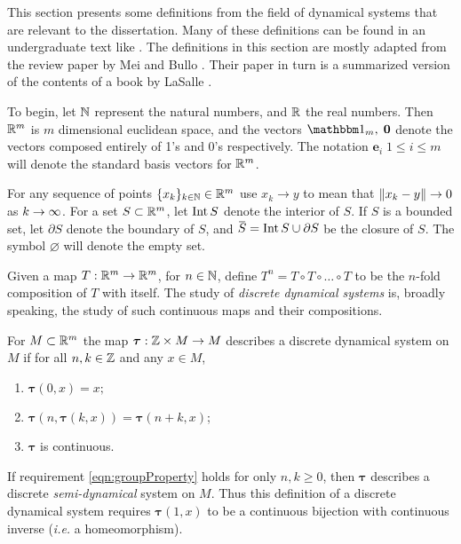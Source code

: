 
This section presents some definitions from the field of dynamical systems that are relevant to the dissertation.  Many of these definitions can be found in an undergraduate text like \cite{devaney1989introduction}. The definitions in this section are mostly adapted from the review paper by Mei and Bullo \cite{mei2017lasalle}. Their paper in turn is a summarized version of the contents of a book by LaSalle \cite{lasalle1976dynsys}.

To begin, let \( \mathbb N \) represent the natural numbers, and \( \mathbb R \) the real numbers. Then \( \mathbb R^m \) is \( m \) dimensional euclidean space, and the vectors \( \mathbbm 1_m,\;\bm 0 \) denote the vectors composed entirely of 1's and 0's respectively. The notation \( \bm e_i\;1\leq i\leq m \) will denote the standard basis vectors for \( \mathbb R^m \).

For any sequence of points \( \{x_k\}_{k\in\mathbb N} \in\mathbb R^m\) use \( {x_k}\rightarrow y \) to mean that \( \norm{x_k-y}\rightarrow 0 \) as \( k\rightarrow\infty\). For a set \( S\subset\mathbb R^m \), let \( \operatorname{Int}S \) denote the interior of \( S \). If \( S \) is a bounded set, let \( \partial S \) denote the boundary of \( S\), and \( \overbar S = \op{Int}S\cup \partial S\) be the closure of \( S \). The symbol \( \varnothing \) will denote the empty set.  

Given a map \( T:\mathbb R^m\rightarrow\mathbb R^m \), for \( n\in \mathbb N \), define \( T^n=T\circ T\circ\ldots\circ T \) to be the \( n \)-fold composition of \( T \) with itself. The study of \textit{discrete dynamical systems} is, broadly speaking, the study of such continuous maps and their compositions. 

\begin{defn}\label{defn:discDynSys}
	For \( M\subset\mathbb R^m \) the map \( \bm\tau:\mathbb Z\times M\rightarrow M \) describes a discrete dynamical system on \( M \) if for all \( n,k\in\mathbb Z \) and any \( x\in M \),
	\begin{enumerate}
		\item \(\bm\tau(0,x) = x;\)
		\item \(\bm\tau(n,\bm\tau(k,x)) = \bm\tau(n+k,x)\);\label{eqn:groupProperty}
		\item \( \bm\tau \) is continuous.
	\end{enumerate}
	If requirement \ref{eqn:groupProperty} holds for only \( n,k\geq 0 \), then \( \bm\tau \) describes a discrete \textit{semi-dynamical} system on \( M \). Thus this definition of a discrete dynamical system requires \( \bm\tau(1,x) \) to be a continuous bijection with continuous inverse (\textit{i.e.} a homeomorphism).
\end{defn}

